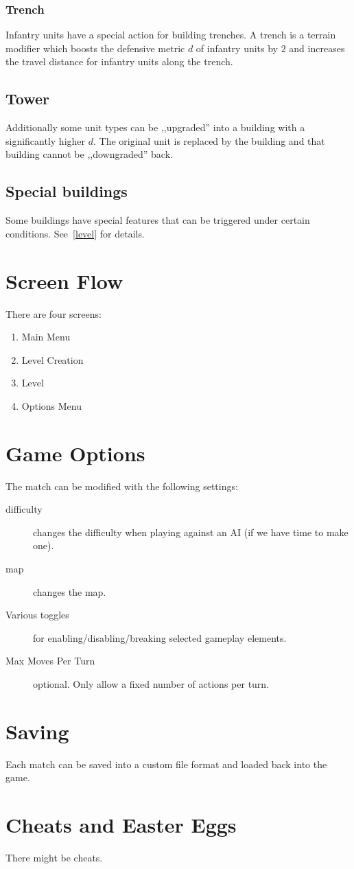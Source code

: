 \subsubsection{Trench}
Infantry units  have a special action for building  trenches. A trench is a terrain modifier which boosts the
defensive metric $d$ of infantry units  by $2$ and increases the travel distance for infantry units  along the trench.
\subsection{Tower}
Additionally some unit  types can be ,,upgraded'' into a building  with a significantly higher $d$. The original unit  is replaced by the
building and that building  cannot be ,,downgraded'' back.
\subsection{Special buildings } %
Some buildings  have special features that can be triggered under certain conditions. See~\ref{level} for details.
\section{Screen Flow} %
There are four screens:

\begin{enumerate}
    \item Main Menu
    \item Level Creation
    \item Level
    \item Options Menu
\end{enumerate}
\section{Game Options} %
The match can be modified with the following settings:

\begin{description}
    \item[difficulty] changes the difficulty when playing against an AI (if we have time to make one).
    \item[map] changes the map.
    \item[Various toggles] for enabling/disabling/breaking selected gameplay elements.
    \item[Max Moves Per Turn] optional. Only allow a fixed number of actions per turn.
\end{description}
\section{Saving}
Each match can be saved into a custom file format and loaded back into the game.
\section{Cheats and Easter Eggs}
There might be cheats.
